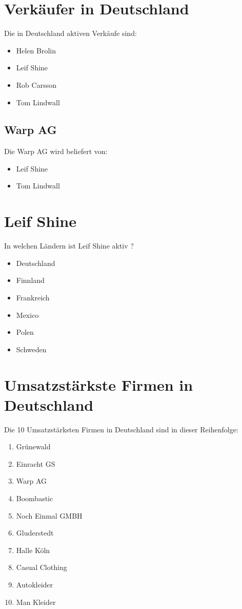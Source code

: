 \documentclass[10pt]{scrartcl}
\author{André Harms, Oliver Steenbuck}
\title{\titletext}
\date{15.11.2012}
\begin{document}
\maketitle

\setcounter{tocdepth}{3}
\tableofcontents

\section{Verkäufer in Deutschland}
Die in Deutschland aktiven Verkäufe sind:
\begin{itemize}
	\item Helen Brolin
	\item Leif Shine
	\item Rob Carsson
	\item Tom Lindwall
\end{itemize}

\subsection{Warp AG}
Die Warp AG wird beliefert von:
\begin{itemize}
	\item Leif Shine
	\item Tom Lindwall
\end{itemize}

\section{Leif Shine}
In welchen Ländern ist Leif Shine aktiv ?
\begin{itemize}
	\item Deutschland
	\item Finnland
	\item Frankreich
	\item Mexico
	\item Polen
	\item Schweden
\end{itemize}


\section{Umsatzstärkste Firmen in Deutschland}
Die 10 Umsatzstärksten Firmen in Deutschland sind in dieser Reihenfolge:
\begin{enumerate}
	\item Grünewald
	\item Einracht GS
	\item Warp AG
	\item Boombastic
	\item Noch Einmal GMBH
	\item Gluderstedt
	\item Halle Köln
	\item Casual Clothing
	\item Autokleider
	\item Man Kleider
\end{enumerate}
\end{document}
